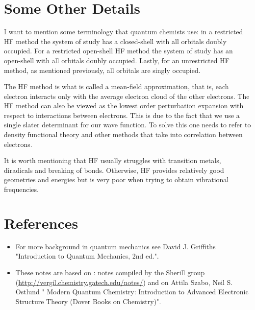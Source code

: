 \documentclass[a4paper]{article}
\begin{document}
\section{Some Other Details}
I want to mention some terminology that quantum chemists use:
in a restricted HF method the system of study has a closed-shell with all orbitals doubly occupied.
For a restricted open-shell HF method the system of study has an open-shell with all orbitals doubly occupied.
Lastly, for an unrestricted HF method, as mentioned previously, all orbitals are singly occupied.

The HF method is what is called a mean-field approximation, that is, each electron interacts only with the average electron cloud of the other electrons. The HF method can also be viewed as the lowest order perturbation expansion with respect to interactions between electrons.
This is due to the fact that we use a single slater determinant for our wave function.
To solve this one needs to refer to density functional theory and other methods that take into correlation between electrons.

It is worth mentioning that HF usually struggles with transition metals, diradicals and breaking of bonds.
Otherwise, HF provides relatively good geometries and energies but is very poor when trying to obtain vibrational frequencies.


\section{References}
\begin{itemize}
\item For more background in quantum mechanics see David J. Griffiths "Introduction to Quantum Mechanics, 2nd ed.".
\item These notes are based on : notes compiled by the Sherill group (\url{http://vergil.chemistry.gatech.edu/notes/}) and on Attila Szabo, Neil S. Ostlund " Modern Quantum Chemistry: Introduction to Advanced Electronic Structure Theory (Dover Books on Chemistry)". 


\end{itemize}
\end{document}
